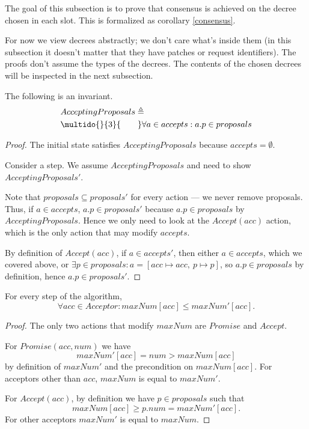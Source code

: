 \documentclass[12pt,a4paper,en]{pracamgr}
\newcommand{\ind}[1]{\multido{}{#1}{\qquad}}
\begin{document}
The goal of this subsection is to prove that consensus is achieved on the decree chosen in each slot. This is formalized as corollary \ref{consensus}.

For now we view decrees abstractly; we don't care what's inside them (in this subsection it doesn't matter that they have patches or request identifiers). The proofs don't assume the types of the decrees. The contents of the chosen decrees will be inspected in the next subsection.

\begin{lemma}
    The following is an invariant.
    \begin{align*}
        & AcceptingProposals \triangleq \\
        & \ind{3} \forall a \in accepts: a.p \in proposals 
    \end{align*}
\end{lemma}
\begin{proof}
    The initial state satisfies $AcceptingProposals$ because $accepts = \emptyset$.

    Consider a step. We assume $AcceptingProposals$ and need to show $AcceptingProposals'$.

    Note that $proposals \subseteq proposals'$ for every action --- we never remove proposals. Thus, if $a \in accepts$, $a.p \in proposals'$ because $a.p \in proposals$ by $AcceptingProposals$. Hence we only need to look at the $Accept(acc)$ action, which is the only action that may modify $accepts$.

    By definition of $Accept(acc)$, if $a \in accepts'$, then either $a \in accepts$, which we covered above, or $\exists p \in proposals: a = [acc \mapsto acc,\ p \mapsto p]$, so $a.p \in proposals$ by definition, hence $a.p \in proposals'$.
\end{proof}

\begin{lemma}\label{maxNumGrows}
    For every step of the algorithm,
    $$ \forall acc \in Acceptor: maxNum[acc] \le maxNum'[acc]. $$
\end{lemma}
\begin{proof}
    The only two actions that modify $maxNum$ are $Promise$ and $Accept$.

    For $Promise(acc, num)$ we have
    $$ maxNum'[acc] = num > maxNum[acc] $$
    by definition of $maxNum'$ and the precondition on $maxNum[acc]$. For acceptors other than $acc$, $maxNum$ is equal to $maxNum'$.

    For $Accept(acc)$, by definition we have $p \in proposals$ such that
    $$ maxNum[acc] \ge p.num = maxNum'[acc]. $$
    For other acceptors $maxNum'$ is equal to $maxNum$.
\end{proof}
\end{document}
